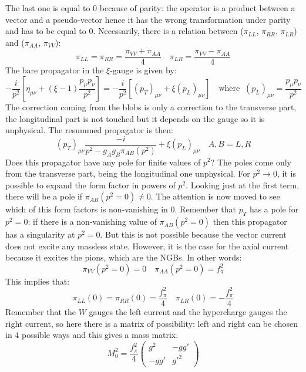 \documentclass[../main.tex]{subfiles}
\begin{document}
The last one is equal to 0 because of parity: the operator is a product between a vector and a pseudo-vector hence it has the wrong transformation under parity and has to be equal to 0. Necessarily, there is a relation between ($\pi_{LL}$, $\pi_{RR}$, $\pi_{LR}$) and ($\pi_{AA}$, $\pi_{VV}$):
\[
\pi_{LL}=\pi_{RR}=\frac{\pi_{VV}+\pi_{AA}}{4} \quad \pi_{LR}=\frac{\pi_{VV}-\pi_{AA}}{4}
\]
The bare propagator in the $\xi$-gauge is given by:
\[
-\frac{i}{p^2}\left[\eta_{\mu\nu}+(\xi-1)\frac{p_\mu p_\nu}{p^2}\right]=-\frac{i}{p^2}\left[(p_T)_{\mu\nu}+\xi(p_L)_{\mu\nu}\right] \quad \text{where} \;\; (p_L)_{\mu\nu}=\frac{p_\mu p_\nu}{p^2}
\]
The correction coming from the blobs is only a correction to the transverse part, the longitudinal part is not touched but it depends on the gauge so it is unphysical. The resummed propagator is then:
\[
(p_T)_{\mu\nu}\frac{-i}{p^2-g_Ag_B\pi_{AB}(p^2)}+\xi(p_L)_{\mu\nu} \quad A,B=L,R
\]
Does this propagator have any pole for finite values of $p^2$? The poles come only from the transverse part, being the longitudinal one unphysical. For $p^2\to0$, it is possible to expand the form factor in powers of $p^2$. Looking just at the first term, there will be a pole if $\pi_{AB}(p^2=0)\neq0$. The attention is now moved to see which of this form factors is non-vanishing in 0. Remember that $p_T$ has a pole for $p^2=0$: if there is a non-vanishing value of $\pi_{AB}(p^2=0)$ then this propagator has a singularity at $p^2=0$. But this is not possible because the vector current does not excite any massless state. However, it is the case for the axial current because it excites the pions, which are the NGBs. In other words:
\[
\pi_{VV}(p^2=0)=0 \quad \pi_{AA}(p^2=0)=f^2_\pi
\]
 This implies that:
\[
\pi_{LL}(0)=\pi_{RR}(0)=\frac{f_\pi^2}{4} \quad \pi_{LR}(0)=-\frac{f_\pi^2}{4}
\]
Remember that the $W$ gauges the left current and the hypercharge gauges the right current, so here there is a matrix of possibility: left and right can be chosen in 4 possible ways and this gives a mass matrix.
\[
M_0^2=\frac{f_\pi^2}{4}\left(\begin{array}{cc}
    g^2 & -gg' \\
    -gg' & g'^2
\end{array}\right)
\]
\end{document}
